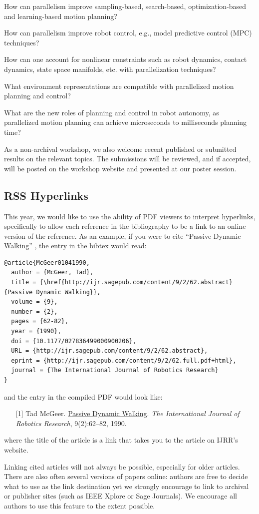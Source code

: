 \documentclass[conference]{IEEEtran}
\begin{document}
    How can parallelism improve sampling-based, search-based, optimization-based and learning-based motion planning?

    How can parallelism improve robot control, e.g., model predictive control (MPC) techniques?

    How can one account for nonlinear constraints such as robot dynamics, contact dynamics, state space manifolds, etc. with parallelization techniques?

    What environment representations are compatible with parallelized motion planning and control?

    What are the new roles of planning and control in robot autonomy, as parallelized motion planning can achieve microseconds to milliseconds planning time?

As a non-archival workshop, we also welcome recent published or submitted results on the relevant topics. The submissions will be reviewed, and if accepted, will be posted on the workshop website and presented at our poster session.

\subsection{RSS Hyperlinks}

This year, we would like to use the ability of PDF viewers to interpret
hyperlinks, specifically to allow each reference in the bibliography to be a
link to an online version of the reference. 
As an example, if you were to cite ``Passive Dynamic Walking''
\cite{McGeer01041990}, the entry in the bibtex would read:

{\small
\begin{verbatim}
@article{McGeer01041990,
  author = {McGeer, Tad}, 
  title = {\href{http://ijr.sagepub.com/content/9/2/62.abstract}{Passive Dynamic Walking}}, 
  volume = {9}, 
  number = {2}, 
  pages = {62-82}, 
  year = {1990}, 
  doi = {10.1177/027836499000900206}, 
  URL = {http://ijr.sagepub.com/content/9/2/62.abstract}, 
  eprint = {http://ijr.sagepub.com/content/9/2/62.full.pdf+html}, 
  journal = {The International Journal of Robotics Research}
}
\end{verbatim}
}
\noindent
and the entry in the compiled PDF would look like:

\def\tmplabel#1{[#1]}

\begin{enumerate}
\item[\tmplabel{1}] Tad McGeer. \href{http://ijr.sagepub.com/content/9/2/62.abstract}{Passive Dynamic
Walking}. {\em The International Journal of Robotics Research}, 9(2):62--82,
1990.
\end{enumerate}
%
where the title of the article is a link that takes you to the article on IJRR's website. 


Linking cited articles will not always be possible, especially for
older articles. There are also often several versions of papers
online: authors are free to decide what to use as the link destination
yet we strongly encourage to link to archival or publisher sites
(such as IEEE Xplore or Sage Journals).  We encourage all authors to use this feature to
the extent possible.
\end{document}
